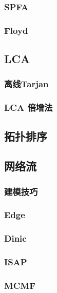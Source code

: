 \documentclass[twocolumn,a4]{article}%
\begin{document}
    \subsubsection{SPFA}
    
    \subsubsection{Floyd}
    
\subsection{LCA}
    \subsubsection{离线Tarjan}
    
    \subsubsection{LCA 倍增法}
    
\subsection{拓扑排序}

\subsection{网络流}
    \subsubsection{建模技巧}
    
    \subsubsection{Edge}
    
    \subsubsection{Dinic}
    
    \subsubsection{ISAP}
    
    \subsubsection{MCMF}
    
\end{document}
